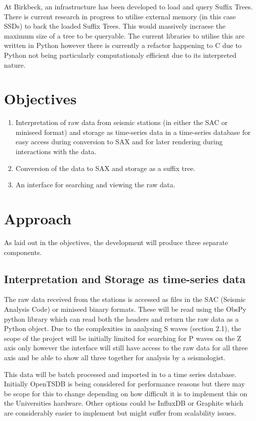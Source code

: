 \documentclass[11pt]{scrartcl}
\begin{document}
	At Birkbeck, an infrastructure has been developed to load and query Suffix Trees.  There is current research in progress to utilise external memory (in this case SSDs) to back the loaded Suffix Trees.  This would massively incraese the maximum size of a tree to be queryable.  The current libraries to utilise this are written in Python however there is currently a refactor happening to C due to Python not being particularly computationaly efficient due to its interpreted nature.

\section{Objectives}
\begin{enumerate}
	\item Interpretation of raw data from seismic stations (in either the SAC or miniseed format) and storage as time-series data in a time-series database for easy access during conversion to SAX and for later rendering during interactions with the data.
	\item Conversion of the data to SAX and storage as a suffix tree.
	\item An interface for searching and viewing the raw data.
\end{enumerate}

\section{Approach}
	As laid out in the objectives, the development will produce three separate components.
	
\subsection{Interpretation and Storage as time-series data}
	The raw data received from the stations is accessed as files in the SAC (Seismic Analysis Code) or miniseed binary formats.  These will be read using the ObsPy python library which can read both the headers and return the raw data as a Python object.  Due to the complexities in analysing S waves (section 2.1), the scope of the project will be initially limited for searching for P waves on the Z axis only however the interface will still have access to the raw data for all three axis and be able to show all three together for analysis by a seismologist.
	
	This data will be batch processed and imported in to a time series database.  Initially OpenTSDB is being considered for performance reasons but there may be scope for this to change depending on how difficult it is to implement this on the Universities hardware.  Other options could be InfluxDB or Graphite which are considerably easier to implement but might suffer from scalability issues.
\end{document}
